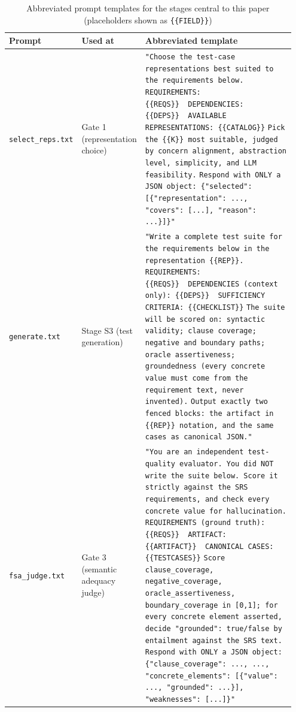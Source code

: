 \documentclass[conference]{IEEEtran}
\begin{document}
  \begin{table}[t]
  \centering
  \caption{Abbreviated prompt templates for the stages central to this paper (placeholders shown as \texttt{\{\{FIELD\}\}})}
  \label{tab:prompts}
  \small
  \begin{tabular}{@{}p{0.17\linewidth}p{0.17\linewidth}p{0.61\linewidth}@{}}
  \toprule
  \textbf{Prompt} & \textbf{Used at} & \textbf{Abbreviated template} \\
  \midrule
  \texttt{select\_reps.txt} & Gate 1 (representation choice) &
  \texttt{"Choose the test-case representations best suited to the requirements below.} \newline
  \texttt{REQUIREMENTS: \{\{REQS\}\}\ \ DEPENDENCIES: \{\{DEPS\}\}\ \ AVAILABLE REPRESENTATIONS: \{\{CATALOG\}\}} \newline
  \texttt{Pick the \{\{K\}\} most suitable, judged by concern alignment, abstraction level, simplicity, and LLM feasibility.} \newline
  \texttt{Respond with ONLY a JSON object: \{"selected": [\{"representation": ..., "covers": [...], "reason": ...\}]\}"} \\
  \addlinespace
  \texttt{generate.txt} & Stage S3 (test generation) &
  \texttt{"Write a complete test suite for the requirements below in the representation \{\{REP\}\}.} \newline
  \texttt{REQUIREMENTS: \{\{REQS\}\}\ \ DEPENDENCIES (context only): \{\{DEPS\}\}\ \ SUFFICIENCY CRITERIA: \{\{CHECKLIST\}\}} \newline
  \texttt{The suite will be scored on: syntactic validity; clause coverage; negative and boundary paths; oracle assertiveness; groundedness (every concrete value must come from the requirement text, never invented).} \newline
  \texttt{Output exactly two fenced blocks: the artifact in \{\{REP\}\} notation, and the same cases as canonical JSON."} \\
  \addlinespace
  \texttt{fsa\_judge.txt} & Gate 3 (semantic adequacy judge) &
  \texttt{"You are an independent test-quality evaluator. You did NOT write the suite below. Score it strictly against the SRS requirements, and check every concrete value for hallucination.} \newline
  \texttt{REQUIREMENTS (ground truth): \{\{REQS\}\}\ \ ARTIFACT: \{\{ARTIFACT\}\}\ \ CANONICAL CASES: \{\{TESTCASES\}\}} \newline
  \texttt{Score clause\_coverage, negative\_coverage, oracle\_assertiveness, boundary\_coverage in [0,1]; for every concrete element asserted, decide "grounded": true/false by entailment against the SRS text.} \newline
  \texttt{Respond with ONLY a JSON object: \{"clause\_coverage": ..., ..., "concrete\_elements": [\{"value": ..., "grounded": ...\}], "weaknesses": [...]\}"} \\
  \bottomrule
  \end{tabular}
  \end{table}
\end{document}
